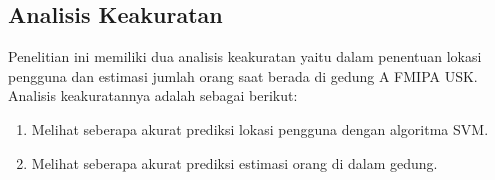 


\subsection{Analisis Keakuratan}
Penelitian ini memiliki dua analisis keakuratan yaitu dalam penentuan lokasi pengguna dan estimasi jumlah orang saat berada di gedung A FMIPA USK. Analisis keakuratannya adalah sebagai berikut:
\begin{enumerate}[1.]
	\item Melihat seberapa akurat prediksi lokasi pengguna dengan  algoritma SVM.
	\item Melihat seberapa akurat prediksi estimasi orang di dalam gedung.
\end{enumerate}
